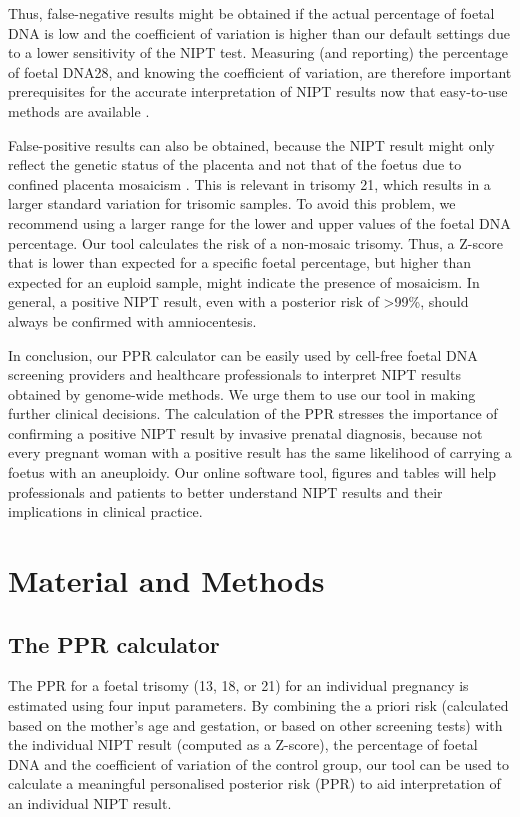 Thus, false-negative results might be obtained if the actual percentage of foetal DNA is low and the coefficient of variation is higher than our default settings due to a lower sensitivity of the NIPT test. 
Measuring (and reporting) the percentage of foetal DNA28, and knowing the coefficient of variation, are therefore important prerequisites for the accurate interpretation of NIPT results \cite{Chiu_2008,Lau_2012} now that easy-to-use methods are available \cite{Straver_2016}.

False-positive results can also be obtained, because the NIPT result might only reflect the genetic status of the placenta and not that of the foetus due to confined placenta mosaicism \cite{Choi_2012,Wang_2013,Mao_2014}. 
This is relevant in trisomy 21, which results in a larger standard variation for trisomic samples. 
To avoid this problem, we recommend using a larger range for the lower and upper values of the foetal DNA percentage. 
Our tool calculates the risk of a non-mosaic trisomy. Thus, a Z-score that is lower than expected for a specific foetal percentage, but higher than expected for an euploid sample, might indicate the presence of mosaicism. 
In general, a positive NIPT result, even with a posterior risk of \textgreater99\%, should always be confirmed with amniocentesis.

In conclusion, our PPR calculator can be easily used by cell-free foetal DNA screening providers and healthcare professionals to interpret NIPT results obtained by genome-wide methods. 
We urge them to use our tool in making further clinical decisions. The calculation of the PPR stresses the importance of confirming a positive NIPT result by invasive prenatal diagnosis, because not every pregnant woman with a positive result has the same likelihood of carrying a foetus with an aneuploidy. 
Our online software tool, figures and tables will help professionals and patients to better understand NIPT results and their implications in clinical practice.

\section{Material and Methods}
\subsection{The PPR calculator}
The PPR for a foetal trisomy (13, 18, or 21) for an individual pregnancy is estimated using four input parameters. 
By combining the a priori risk (calculated based on the mother’s age and gestation, or based on other screening tests) with the individual NIPT result (computed as a Z-score), the percentage of foetal DNA and the coefficient of variation of the control group, our tool can be used to calculate a meaningful personalised posterior risk (PPR) to aid interpretation of an individual NIPT result.

